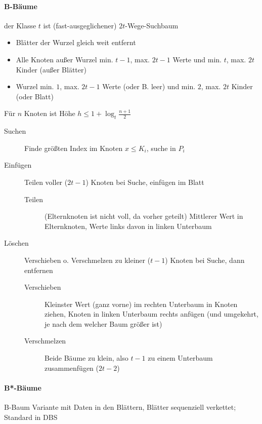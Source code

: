 \paragraph{B-Bäume}
der Klasse $t$ ist (fast-ausgeglichener) $2t$-Wege-Suchbaum

\begin{itemize}
  \item Blätter der Wurzel gleich weit entfernt
  \item Alle Knoten au\ss er Wurzel min. $t -1$, max. $2t -1$ Werte und min. $t$, max. $2t$ Kinder (au\ss er Blätter)
  \item Wurzel min. $1$, max. $2t - 1$ Werte (oder B. leer) und min. $2$, max. $2t$ Kinder (oder Blatt)
\end{itemize}

Für $n$ Knoten ist Höhe $h \leq 1 + \log_t \frac{n + 1}{2}$

\begin{description}
  \item[Suchen] Finde grö\ss ten Index im Knoten $x \leq K_i$, suche in $P_i$

  \item[Einfügen] Teilen voller ($2t - 1$) Knoten bei Suche, einfügen im Blatt

    \begin{description}
      \item[Teilen] (Elternknoten ist nicht voll, da vorher geteilt) Mittlerer Wert in Elternknoten, Werte links davon in linken Unterbaum
    \end{description}

  \item[Löschen] Verschieben o. Verschmelzen zu kleiner ($t - 1$) Knoten bei Suche, dann entfernen

    \begin{description}
      \item[Verschieben] Kleinster Wert (ganz vorne) im rechten Unterbaum in Knoten ziehen, Knoten in linken Unterbaum rechts anfügen (und umgekehrt, je nach dem welcher Baum grö\ss er ist)

      \item[Verschmelzen] Beide Bäume zu klein, also $t - 1$ zu einem Unterbaum zusammenfügen ($2t - 2$)
    \end{description}

\end{description}

\paragraph{B*-Bäume}
B-Baum Variante mit Daten in den Blättern, Blätter sequenziell verkettet; Standard in DBS

